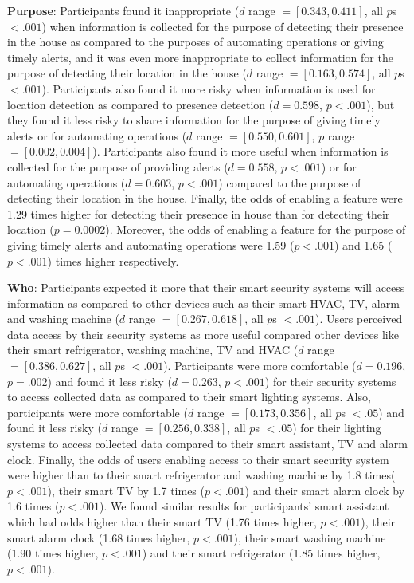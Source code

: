 \textbf{Purpose}: Participants found it inappropriate ($d$ range $= [0.343, 0.411]$, all $p$s $< .001$) when information is collected for the purpose of detecting their presence in the house as compared to the purposes of automating operations or giving timely alerts, and it was even more inappropriate to collect information for the purpose of detecting their location in the house ($d$ range $= [0.163, 0.574]$, all $p$s $< .001$). Participants also found it more risky when information is used for location detection as compared to presence detection ($d = 0.598$, $p < .001$), but they found it less risky to share information for the purpose of giving timely alerts or for automating operations ($d$ range  $= [0.550, 0.601]$, $p$ range $= [0.002, 0.004]$). Participants also found it more useful when information is collected for the purpose of providing alerts ($d = 0.558$, $p < .001$) or for automating operations ($d = 0.603$, $p < .001$) compared to the purpose of detecting their location in the house. Finally, the odds of enabling a feature were 1.29 times higher for detecting their presence in house than for detecting their location ($p = 0.0002$). Moreover, the odds of enabling a feature for the purpose of giving timely alerts and automating operations were 1.59 ($p < .001$) and 1.65 ($p < .001$) times higher respectively. 

\textbf{Who}: Participants expected it more that their smart security systems will access information as compared to other devices such as their smart HVAC, TV, alarm and washing machine ($d$ range $=  [0.267, 0.618]$, all $p$s $< .001$). Users perceived data access by their security systems as more useful compared other devices like their smart refrigerator, washing machine, TV and HVAC ($d$ range $= [0.386, 0.627]$, all $p$s $< .001$). Participants were more comfortable ($d = 0.196$, $p = .002$) and found it less risky ($d = 0.263$, $p < .001$) for their security systems to access collected data as compared to their smart lighting systems. Also, participants were more comfortable ($d$ range $=  [0.173, 0.356]$, all $p$s $< .05$) and found it less risky ($d$ range $= [0.256, 0.338]$, all $p$s $< .05$) for their lighting systems to access collected data compared to their smart assistant, TV and alarm clock. Finally, the odds of users enabling access to their smart security system were higher than to their smart refrigerator and washing machine by 1.8 times($p < .001$), their smart TV by 1.7 times ($p < .001$) and their smart alarm clock by 1.6 times ($p < .001$). We found similar results for participants' smart assistant which had odds higher than their smart TV (1.76 times higher,  $p < .001$), their smart alarm clock (1.68 times higher,  $p < .001$), their smart washing machine (1.90 times higher,  $p < .001$) and their smart refrigerator (1.85 times higher,  $p < .001$).

